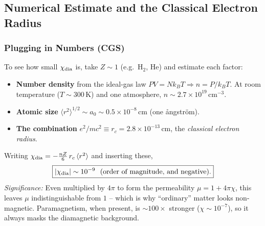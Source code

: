 
\subsection{Numerical Estimate and the Classical Electron Radius}\label{subsec:lec19-estimate}

\subsubsection*{Plugging in Numbers (CGS)}
To see how small $\chi_{\rm dia}$ is, take $Z\sim1$ (e.g.\ $\mathrm{H}_2$, He) and estimate
each factor:
\begin{itemize}
  \item \textbf{Number density} from the ideal-gas law $PV=Nk_BT\Rightarrow n=P/k_BT$. At
        room temperature ($T\sim300\,\mathrm{K}$) and one atmosphere,
        $n\sim2.7\times10^{19}\,\mathrm{cm^{-3}}$.
  \item \textbf{Atomic size} $\langle r^2\rangle^{1/2}\sim a_0\sim0.5\times10^{-8}\,\mathrm{cm}$
        (one \aa ngstr\"om).
  \item \textbf{The combination} $e^2/mc^2\equiv r_c=2.8\times10^{-13}\,\mathrm{cm}$, the
        \emph{classical electron radius}.
\end{itemize}
Writing $\chi_{\rm dia}=-\tfrac{nZ}{6}\,r_c\,\langle r^2\rangle$ and inserting these,
\begin{equation}\label{eq:lec19-chi-number}
  \boxed{|\chi_{\rm dia}|\sim 10^{-9}\ \ (\text{order of magnitude, and negative}).}
\end{equation}
\textit{Significance:} Even multiplied by $4\pi$ to form the permeability
$\mu=1+4\pi\chi$, this leaves $\mu$ indistinguishable from $1$ -- which is why ``ordinary''
matter looks non-magnetic. Paramagnetism, when present, is $\sim100\times$ stronger
($\chi\sim10^{-7}$), so it always masks the diamagnetic background.

